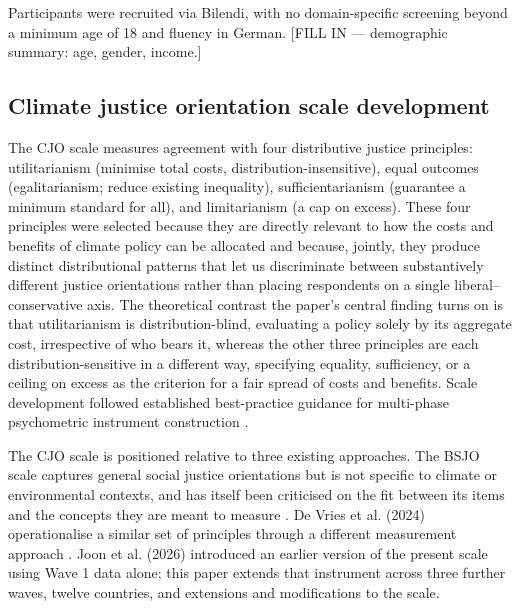 \documentclass[10pt,letterpaper]{article}
\begin{document}
Participants were recruited via Bilendi, with no domain-specific screening beyond a minimum age of 18 and fluency in German.
[FILL IN — demographic summary: age, gender, income.]

\subsection*{Climate justice orientation scale development}

The CJO scale measures agreement with four distributive justice principles: utilitarianism (minimise total costs, distribution-insensitive), equal outcomes (egalitarianism; reduce existing inequality), sufficientarianism (guarantee a minimum standard for all), and limitarianism (a cap on excess).
These four principles were selected because they are directly relevant to how the costs and benefits of climate policy can be allocated \autocite{zimm2024} and because, jointly, they produce distinct distributional patterns that let us discriminate between substantively different justice orientations rather than placing respondents on a single liberal–conservative axis.
The theoretical contrast the paper's central finding turns on is that utilitarianism is distribution-blind, evaluating a policy solely by its aggregate cost, irrespective of who bears it, whereas the other three principles are each distribution-sensitive in a different way, specifying equality, sufficiency, or a ceiling on excess as the criterion for a fair spread of costs and benefits.
Scale development followed established best-practice guidance for multi-phase psychometric instrument construction \autocite{boateng2018}.


The CJO scale is positioned relative to three existing approaches.
The BSJO scale \autocite{hulle2018} captures general social justice orientations but is not specific to climate or environmental contexts, and has itself been criticised on the fit between its items and the concepts they are meant to measure \autocite{hootegem2021}.
De Vries et al. (2024) operationalise a similar set of principles through a different measurement approach \autocite{devries2024}.
Joon et al. (2026) \autocite{joon2026} introduced an earlier version of the present scale using Wave 1 data alone; this paper extends that instrument across three further waves, twelve countries, and extensions and modifications to the scale.
\end{document}
